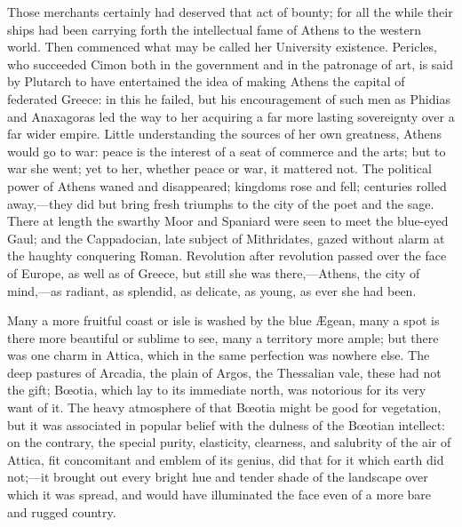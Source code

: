 Those merchants certainly had deserved that act of bounty; for all
the while their ships had been carrying forth the intellectual fame of
Athens to the western world. Then commenced what may be called her
University existence. Pericles, who succeeded Cimon both in the
government and in the patronage of art, is said by Plutarch to have
entertained the idea of making Athens the capital of federated Greece:
in this he failed, but his encouragement of such men as Phidias and
Anaxagoras led the way to her acquiring a far more lasting sovereignty
over a far wider empire. Little understanding the sources of her own
greatness, Athens would go to war: peace is the interest of a seat of
commerce and the arts; but to war she went; yet to her, whether
peace or war, it mattered not. The political power of Athens waned and
disappeared; kingdoms rose and fell; centuries rolled away,—they did
but bring fresh triumphs to the city of the poet and the sage. There
at length the swarthy Moor and Spaniard were seen to meet the
blue-eyed Gaul; and the Cappadocian, late subject of Mithridates,
gazed without alarm at the haughty conquering Roman. Revolution after
revolution passed over the face of Europe, as well as of Greece, but
still she was there,—Athens, the city of mind,—as radiant, as
splendid, as delicate, as young, as ever she had been.

Many a more fruitful coast or isle is washed by the blue Ægean,
many a spot is there more beautiful or sublime to see, many a
territory more ample; but there was one charm in Attica, which in the
same perfection was nowhere else. The deep pastures of Arcadia, the
plain of Argos, the Thessalian vale, these had not the gift; Bœotia,
which lay to its immediate north, was notorious for its very want of
it. The heavy atmosphere of that Bœotia might be good for vegetation,
but it was associated in popular belief with the dulness of the
Bœotian intellect: on the contrary, the special purity, elasticity,
clearness, and salubrity of the air of Attica, fit concomitant and
emblem of its genius, did that for it which earth did not;—it
brought out every bright hue and tender shade of the landscape over
which it was spread, and would have illuminated the face even of a
more bare and rugged country.

